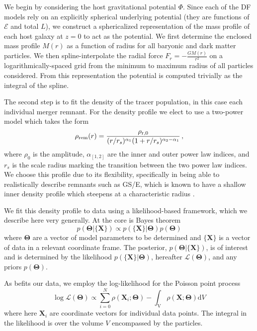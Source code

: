 We begin by considering the host gravitational potential $\Phi$. Since each of the DF models rely on an explicitly spherical underlying potential (they are functions of $\mathcal{E}$ and total $L$), we construct a sphericalized representation of the mass profile of each host galaxy at $z=0$ to act as the potential. We first determine the enclosed mass profile $M(r)$ as a function of radius for all baryonic and dark matter particles. We then spline-interpolate the radial force $F_{r} = -\frac{G M(r)}{r^{2}}$ on a logarithmically-spaced grid from the minimum to maximum radius of all particles considered. From this representation the potential is computed trivially as the integral of the spline.

The second step is to fit the density of the tracer population, in this case each individual merger remnant. For the density profile we elect to use a two-power model which takes the form
\begin{equation}
    \label{ch4:eq:two-power-spherical-density}
    \rho_{\rm rem}(r) = \frac{ \rho_{\mathrm{r},0} }{ (r/r_{s})^{\alpha_{1}} (1+r/r_{s})^{\alpha_{2}-\alpha_{1}} }\,,
\end{equation}
\noindent where $\rho_{0}$ is the amplitude, $\alpha_{[1,2]}$ are the inner and outer power law indices, and $r_{s}$ is the scale radius marking the transition between the two power law indices. We choose this profile due to its flexibility, specifically in being able to realistically describe remnants such as GS/E, which is known to have a shallow inner density profile which steepens at a characteristic radius \parencite[e.g.][]{han22,lane23}.

We fit this density profile to data using a likelihood-based framework, which we describe here very generally. At the core is Bayes theorem
\begin{equation}
    \label{ch4:eq:bayes-theorem}
    p(\mathbf{\Theta} \vert \{ \mathbf{X} \} ) \propto p( \{ \mathbf{X} \} \vert \mathbf{\Theta} ) p( \mathbf{\Theta} )
\end{equation}
\noindent where $\mathbf{\Theta}$ are a vector of model parameters to be determined and $\{ \mathbf{X} \}$ is a vector of data in a relevant coordinate frame. The posterior, $p(\mathbf{\Theta} \vert \{ \mathbf{X} \} )$, is of interest and is determined by the likelihood $p( \{ \mathbf{X} \} \vert \mathbf{\Theta} )$, hereafter $\mathcal{L}(\mathbf{\Theta})$, and any priors $p( \mathbf{\Theta} )$.

As befits our data, we employ the log-likelihood for the Poisson point process
\begin{equation}
    \label{ch4:eq:loglikelihood-poisson-point-process}
    \log \mathcal{L}(\mathbf{\Theta}) \propto  \sum_{i=0}^{N} \rho(\mathbf{X}_{i}; \mathbf{\Theta}) - \int_{\mathrm{V}} \rho(\mathbf{X}; \mathbf{\Theta} ) \mathrm{d}V
\end{equation}
\noindent where here $\mathbf{X}_{i}$ are coordinate vectors for individual data points. The integral in the likelihood is over the volume $V$ encompassed by the particles.


